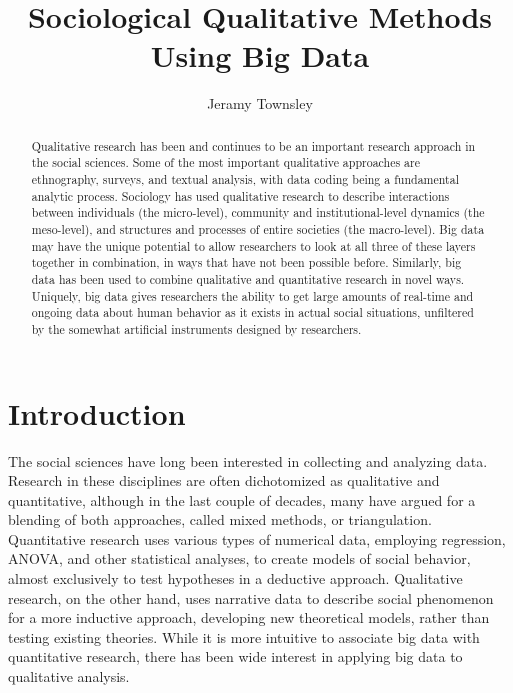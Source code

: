 \documentclass[sigconf]{acmart}
\begin{document}
\title{Sociological Qualitative Methods Using Big Data}


\author{Jeramy Townsley}

\begin{abstract}
Qualitative research has been and continues to be an important research approach in the social sciences.  Some of the most important qualitative approaches are ethnography, surveys, and textual analysis, with data coding being a fundamental analytic process.  Sociology has used qualitative research to describe interactions between individuals (the micro-level), community and institutional-level dynamics (the meso-level), and structures and processes of entire societies (the macro-level).  Big data may have the unique potential to allow researchers to look at all three of these layers together in combination, in ways that have not been possible before. Similarly, big data has been used to combine qualitative and quantitative research in novel ways.  Uniquely, big data gives researchers the ability to get large amounts of real-time and ongoing data about human behavior as it exists in actual social situations, unfiltered by the somewhat artificial instruments designed by researchers.
\end{abstract}


\maketitle

\section{Introduction}
The social sciences have long been interested in collecting and analyzing data.  Research in these disciplines are often dichotomized as qualitative and quantitative, although in the last couple of decades, many have argued for a blending of both approaches, called mixed methods, or triangulation.  Quantitative research uses various types of numerical data, employing regression, ANOVA, and other statistical analyses, to create models of social behavior, almost exclusively to test hypotheses in a deductive approach.  Qualitative research, on the other hand, uses narrative data to describe social phenomenon for a more inductive approach, developing new theoretical models, rather than testing existing theories. \cite{bryman16} While it is more intuitive to associate big data with quantitative research, there has been wide interest in applying big data to qualitative analysis.
\end{document}
